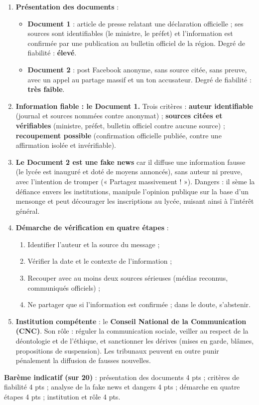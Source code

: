 \documentclass[11pt]{article}
\newcommand{\cle}[1]{{\popxbold\color{popdark}#1}}
\begin{document}
\begin{corrige}
\begin{enumerate}
\item \textbf{Présentation des documents} :
\begin{itemize}
\item \textbf{Document 1} : article de presse relatant une déclaration officielle ; ses sources sont identifiables (le ministre, le préfet) et l'information est confirmée par une publication au bulletin officiel de la région. Degré de fiabilité : \textbf{élevé}.
\item \textbf{Document 2} : post Facebook anonyme, sans source citée, sans preuve, avec un appel au partage massif et un ton accusateur. Degré de fiabilité : \textbf{très faible}.
\end{itemize}
\item \textbf{Information fiable : le Document 1.} Trois critères : \textbf{auteur identifiable} (journal et sources nommées contre anonymat) ; \textbf{sources citées et vérifiables} (ministre, préfet, bulletin officiel contre aucune source) ; \textbf{recoupement possible} (confirmation officielle publiée, contre une affirmation isolée et invérifiable).
\item \textbf{Le Document 2 est une \cle{fake news}} car il diffuse une information fausse (le lycée est inauguré et doté de moyens annoncés), sans auteur ni preuve, avec l'intention de tromper (« Partagez massivement ! »). Dangers : il sème la défiance envers les institutions, manipule l'opinion publique sur la base d'un mensonge et peut décourager les inscriptions au lycée, nuisant ainsi à l'intérêt général.
\item \textbf{Démarche de vérification en quatre étapes} :
\begin{enumerate}
\item Identifier l'auteur et la source du message ;
\item Vérifier la date et le contexte de l'information ;
\item Recouper avec au moins deux sources sérieuses (médias reconnus, communiqués officiels) ;
\item Ne partager que si l'information est confirmée ; dans le doute, s'abstenir.
\end{enumerate}
\item \textbf{Institution compétente} : le \textbf{Conseil National de la Communication (CNC)}. Son rôle : réguler la communication sociale, veiller au respect de la déontologie et de l'éthique, et sanctionner les dérives (mises en garde, blâmes, propositions de suspension). Les tribunaux peuvent en outre punir pénalement la diffusion de fausses nouvelles.
\end{enumerate}
\textbf{Barème indicatif (sur 20)} : présentation des documents 4 pts ; critères de fiabilité 4 pts ; analyse de la fake news et dangers 4 pts ; démarche en quatre étapes 4 pts ; institution et rôle 4 pts.


\end{corrige}
\end{document}
